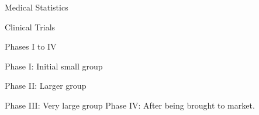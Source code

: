 
Medical Statistics

Clinical Trials

Phases I to IV

 

Phase I:  Initial small group

Phase II: Larger group

Phase III: Very large group
Phase IV: After being brought to market.
